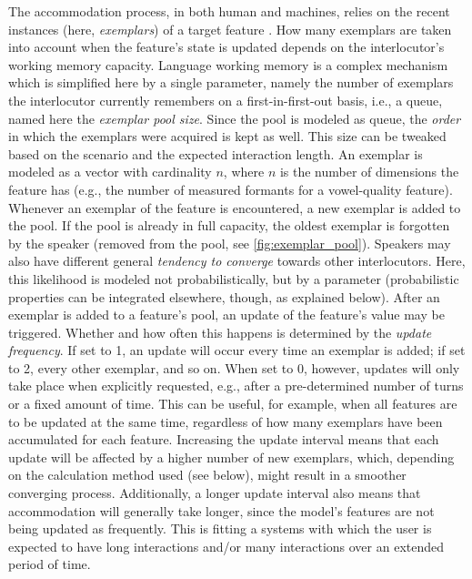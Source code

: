The accommodation process, in both human and machines, relies on the recent instances (here, \textit{exemplars}) of a target feature .
How many exemplars are taken into account when the feature's state is updated depends on the interlocutor's working memory capacity.
Language working memory is a complex mechanism \citep[see][]{Baddeley2003working} which is simplified here by a single parameter, namely the number of exemplars the interlocutor currently remembers on a first-in-first-out basis, i.e., a queue, named here the \textit{exemplar pool size}.
Since the pool is modeled as queue, the \emph{order} in which the exemplars were acquired is kept as well.
This size can be tweaked based on the scenario and the expected interaction length.
An exemplar is modeled as a vector with cardinality $n$, where $n$ is the number of dimensions the feature has (e.g., the number of measured formants for a vowel-quality feature).
Whenever an exemplar of the feature is encountered, a new exemplar is added to the pool.
If the pool is already in full capacity, the oldest exemplar is forgotten by the speaker (removed from the pool, see \cref{fig:exemplar_pool}).
Speakers may also have different general \textit{tendency to converge} towards other interlocutors.
Here, this likelihood is modeled not probabilistically, but by a parameter (probabilistic properties can be integrated elsewhere, though, as explained below).
After an exemplar is added to a feature's pool, an update of the feature's value may be triggered.
Whether and how often this happens is determined by the \textit{update frequency}.
If set to 1, an update will occur every time an exemplar is added; if set to 2, every other exemplar, and so on.
When set to 0, however, updates will only take place when explicitly requested, e.g., after a pre-determined number of turns or a fixed amount of time.
This can be useful, for example, when all features are to be updated at the same time, regardless of how many exemplars have been accumulated for each feature.
Increasing the update interval means that each update will be affected by a higher number of new exemplars, which, depending on the calculation method used (see below), might result in a smoother converging process.
Additionally, a longer update interval also means that accommodation will generally take longer, since the model's features are not being updated as frequently.
This is fitting a systems with which the user is expected to have long interactions and/or many interactions over an extended period of time.

